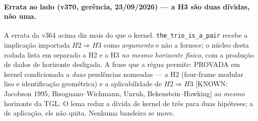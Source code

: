 \documentclass[11pt]{article}
\theoremstyle{definition}\newtheorem{deriv}{Derivação}
\begin{document}
\paragraph*{Errata ao lado (v370, gerência, 23/09/2026) --- a H3 são duas dívidas, não uma.} A errata da v364 acima diz mais do que o kernel. \texttt{the\_trio\_is\_a\_pair} recebe a implicação importada $H2\Rightarrow H3$ como \emph{argumento} e não a fornece; o núcleo desta rodada lista em separado a H2 e a H3 \emph{no mesmo horizonte físico}, com a produção de dados de horizonte desligada. A frase que a régua permite: PROVADA em kernel condicionada a \emph{duas} pendências nomeadas --- a H2 (four-frame modular liso e identificação geométrica) e a aplicabilidade de $H2\Rightarrow H3$ [KNOWN: Jacobson 1995, Bisognano--Wichmann, Unruh, Bekenstein--Hawking] ao \emph{mesmo} horizonte da TGL. O lema reduz a dívida de kernel de três para duas hipóteses; a de aplicação, ele não quita. Nenhuma bandeira se move.
\end{document}
